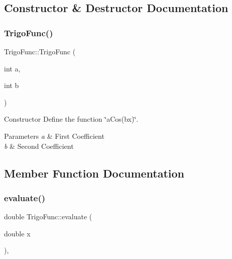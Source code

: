 \subsection{Constructor \& Destructor Documentation}
\mbox{\label{classTrigoFunc_aee28a8cc4b96ef97e3da805b0d9e624e}} 
\subsubsection{\texorpdfstring{Trigo\+Func()}{TrigoFunc()}}
{\footnotesize\ttfamily Trigo\+Func\+::\+Trigo\+Func (\begin{DoxyParamCaption}\item[{int}]{a,  }\item[{int}]{b }\end{DoxyParamCaption})\hspace{0.3cm}{\ttfamily [inline]}}



Constructor Define the function \char`\"{}a\+Cos(bx)\char`\"{}. 


\begin{DoxyParams}{Parameters}
{\em a} & First Coefficient \\
\hline
{\em b} & Second Coefficient \\
\hline
\end{DoxyParams}


\subsection{Member Function Documentation}
\mbox{\label{classTrigoFunc_ac04acbf2d2b7301d6e2084c9bb8daab2}} 
\subsubsection{\texorpdfstring{evaluate()}{evaluate()}}
{\footnotesize\ttfamily double Trigo\+Func\+::evaluate (\begin{DoxyParamCaption}\item[{double}]{x }\end{DoxyParamCaption})\hspace{0.3cm}{\ttfamily [override]}, {\ttfamily [virtual]}}



